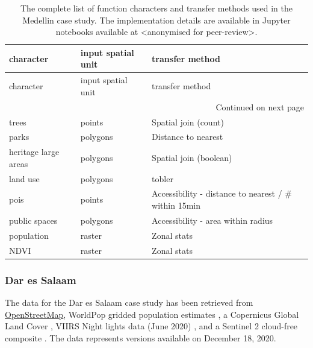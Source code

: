 \begin{longtable}{p{5cm}p{3cm}p{5cm}}
\caption{The complete list of function characters and transfer methods used in the Medellin case study. The implementation details are available
in Jupyter notebooks available at <anonymised for peer-review>.}
\label{tab:fn_med} \\
\toprule
                                            character & input spatial unit &                                    transfer method \\
\midrule
\endfirsthead

\toprule
                                            character & input spatial unit &                                    transfer method \\
\midrule
\endhead
\midrule
\multicolumn{3}{r}{{Continued on next page}} \\
\midrule
\endfoot

\bottomrule
\endlastfoot
                trees &   points &                               Spatial join (count) \\
                parks & polygons &                                Distance to nearest \\
heritage large areas & polygons &                               Spatial join (boolean) \\
            land use & polygons &                                             tobler \\
                pois &   points & Accessibility  - distance to nearest / \# within 15min \\
        public spaces & polygons &             Accessibility  -  area within radius \\
            population &   raster &                                        Zonal stats \\
                NDVI &   raster &                                        Zonal stats \\
\end{longtable}

\subsubsection{Dar es Salaam}

The data for the Dar es Salaam case study has been retrieved from
\href{https://osm.org}{OpenStreetMap}, WorldPop gridded population estimates
\citep{bondarenko2020census}, a Copernicus Global Land Cover
\citep{marcel_buchhorn_2020_3939050}, VIIRS Night lights data (June 2020) \citep{elvidge2013viirs},
and a Sentinel 2 cloud-free composite \citep{CORBANE2020105737}. The data represents
versions available on December 18, 2020.

